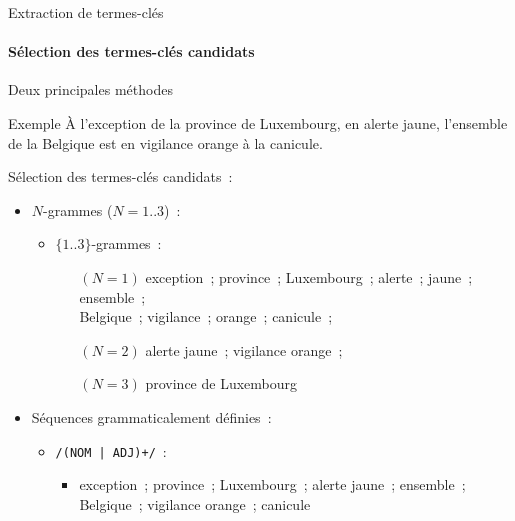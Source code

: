   \begin{frame}{Extraction de termes-clés}\framesubtitle{Sélection des termes-clés candidats}
    Deux principales méthodes

    \begin{exampleblock}{Exemple}\justifying
      \og{}À l'exception de la province de Luxembourg, en alerte jaune,
      l'ensemble de la Belgique est en vigilance orange à la canicule.\fg{}

      \vspace{1em}

      Sélection des termes-clés candidats~:
      \begin{itemize}
        \item{$N$-grammes ($N = 1..3$)~:}
          \begin{itemize}
            \item{$\{1..3\}$-grammes~:}
            \begin{itemize}\setlength{\itemindent}{.5cm}
              \item[$(N = 1)$]{
                exception~; province~; Luxembourg~; alerte~; jaune~; ensemble~;\\
                \hspace{.5cm}Belgique~; vigilance~; orange~; canicule~;
              }
              \item[$(N = 2)$]{
                alerte jaune~; vigilance orange~;
              }
              \item[$(N = 3)$]{
                province de Luxembourg
              }
            \end{itemize}
          \end{itemize}
        \item{Séquences grammaticalement définies~:}
          \begin{itemize}
            \item{\texttt{/(NOM | ADJ)+/}~:}
            \begin{itemize}\setlength{\itemindent}{.5cm}
              \item{exception~; province~; Luxembourg~; alerte jaune~;
                    ensemble~;\\
                    \hspace{.5cm}Belgique~; vigilance orange~; canicule}
            \end{itemize}
          \end{itemize}
      \end{itemize}
    \end{exampleblock}
  \end{frame}

